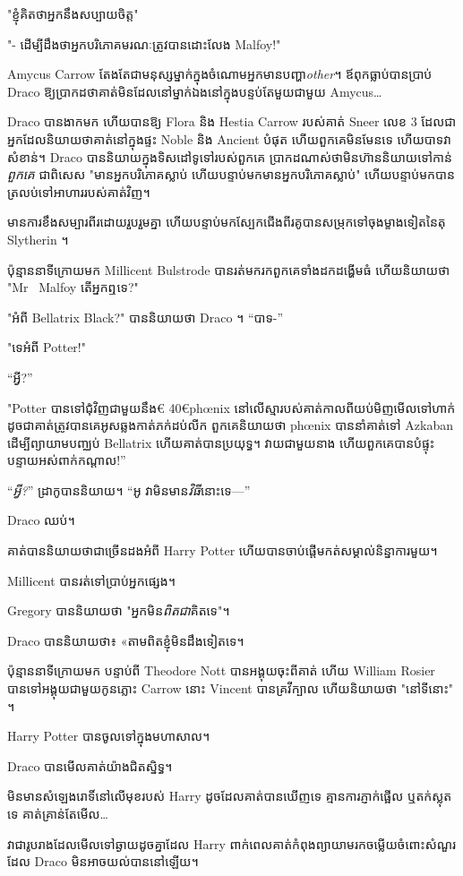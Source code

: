 {"ខ្ញុំគិតថាអ្នកនឹងសប្បាយចិត្ត"

"- ដើម្បីដឹងថាអ្នកបរិភោគមរណៈត្រូវបានដោះលែង Malfoy!"

Amycus Carrow តែងតែជាមនុស្សម្នាក់ក្នុងចំណោមអ្នកមានបញ្ហា\emph{other}។ ឪពុកធ្លាប់បានប្រាប់ Draco ឱ្យប្រាកដថាគាត់មិនដែលនៅម្នាក់ឯងនៅក្នុងបន្ទប់តែមួយជាមួយ Amycus…

Draco បានងាកមក ហើយបានឱ្យ Flora និង Hestia Carrow របស់គាត់ Sneer លេខ 3 ដែលជាអ្នកដែលនិយាយថាគាត់នៅក្នុងផ្ទះ Noble និង Ancient បំផុត ហើយពួកគេមិនមែនទេ ហើយបាទវាសំខាន់។ Draco បាននិយាយក្នុងទិសដៅទូទៅរបស់ពួកគេ ប្រាកដណាស់ថាមិនហ៊ាននិយាយទៅកាន់ \emph{ពួកគេ} ជាពិសេស "មានអ្នកបរិភោគស្លាប់ ហើយបន្ទាប់មកមានអ្នកបរិភោគស្លាប់" ហើយបន្ទាប់មកបានត្រលប់ទៅអាហាររបស់គាត់វិញ។

មាន​ការ​ខឹងសម្បារ​ពីរ​ដោយ​រួបរួម​គ្នា ហើយ​បន្ទាប់​មក​ស្បែកជើង​ពីរ​គូ​បាន​សម្រុក​ទៅ​ចុង​ម្ខាង​ទៀត​នៃ​តុ Slytherin ។

ប៉ុន្មាននាទីក្រោយមក Millicent Bulstrode បានរត់មករកពួកគេទាំងដកដង្ហើមធំ ហើយនិយាយថា "Mr~ Malfoy តើអ្នកឮទេ?"

"អំពី Bellatrix Black?" បាននិយាយថា Draco ។ “បាទ-”

"ទេអំពី Potter!"

“អ្វី?”

"Potter បានទៅជុំវិញជាមួយនឹង€ 40€{phœnix} នៅលើស្មារបស់គាត់កាលពីយប់មិញមើលទៅហាក់ដូចជាគាត់ត្រូវបានគេអូសឆ្លងកាត់ភក់ដប់លីក ពួកគេនិយាយថា phœnix បាននាំគាត់ទៅ Azkaban ដើម្បីព្យាយាមបញ្ឈប់ Bellatrix ហើយគាត់បានប្រយុទ្ធ។ វាយ​ជាមួយ​នាង ហើយ​ពួក​គេ​បាន​បំផ្ទុះ​បន្ទាយ​អស់​ពាក់​កណ្តាល!”

“\emph{អ្វី?}” ដ្រាកូបាននិយាយ។ “អូ វាមិនមាន\emph{វិធី}នោះទេ—”

Draco ឈប់។

គាត់បាននិយាយថាជាច្រើនដងអំពី Harry Potter ហើយបានចាប់ផ្តើមកត់សម្គាល់និន្នាការមួយ។

Millicent បានរត់ទៅប្រាប់អ្នកផ្សេង។

Gregory បាននិយាយថា "អ្នកមិន\emph{{ពិតជា}}គិតទេ"។

Draco បាន​និយាយ​ថា​៖ «​តាម​ពិត​ខ្ញុំ​មិន​ដឹង​ទៀត​ទេ​។

ប៉ុន្មាននាទីក្រោយមក បន្ទាប់ពី Theodore Nott បានអង្គុយចុះពីគាត់ ហើយ William Rosier បានទៅអង្គុយជាមួយកូនភ្លោះ Carrow នោះ Vincent បានគ្រវីក្បាល ហើយនិយាយថា "នៅទីនោះ" ។

Harry Potter បានចូលទៅក្នុងមហាសាល។

Draco បានមើលគាត់យ៉ាងជិតស្និទ្ធ។

មិនមានសំឡេងរោទិ៍នៅលើមុខរបស់ Harry ដូចដែលគាត់បានឃើញទេ គ្មានការភ្ញាក់ផ្អើល ឬតក់ស្លុតទេ គាត់គ្រាន់តែមើល…

វា​ជា​រូបរាង​ដែល​មើល​ទៅ​ឆ្ងាយ​ដូចគ្នា​ដែល Harry ពាក់​ពេល​គាត់​កំពុង​ព្យាយាម​រក​ចម្លើយ​ចំពោះ​សំណួរ​ដែល Draco មិន​អាច​យល់​បាន​នៅ​ឡើយ។

}
